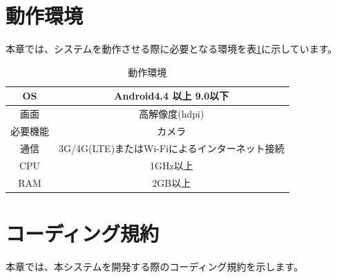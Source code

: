 \documentclass[a4j]{jarticle}
\begin{document}
\section{動作環境}
本章では、システムを動作させる際に必要となる環境を表\ref{Operationg_Environment}に示しています。

\begin{table}[H]
    \caption{動作環境}
    \label{Operationg_Environment}
    \begin{center}
        \begin{tabular}{|c||c|} \hline
            OS & Android4.4 以上 9.0以下 \\ \hline
            画面 & 高解像度(hdpi) \\ \hline
            必要機能 & カメラ \\ \hline
            通信 & 3G/4G(LTE)またはWi-Fiによるインターネット接続 \\ \hline
            CPU & 1GHz以上 \\ \hline
            RAM & 2GB以上 \\ \hline

        \end{tabular}
    \end{center}
\end{table}

\section{コーディング規約}
本章では、本システムを開発する際のコーディング規約を示します。
\end{document}
